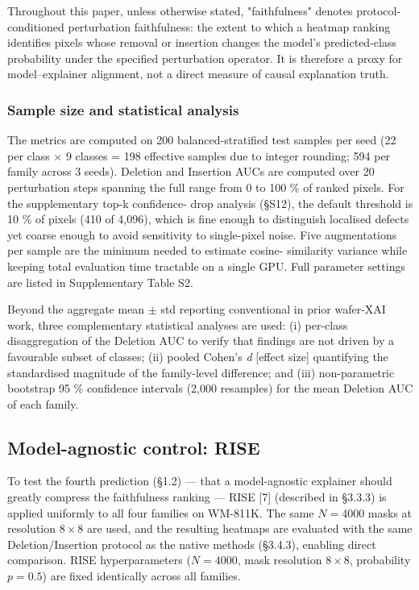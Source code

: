 \documentclass[11pt,a4paper]{article}
\begin{document}
Throughout this paper, unless otherwise stated, "faithfulness" denotes protocol-conditioned perturbation faithfulness: the extent to which a heatmap ranking identifies pixels whose removal or insertion changes the model's predicted-class probability under the specified perturbation operator. It is therefore a proxy for model--explainer alignment, not a direct measure of causal explanation truth.

\subsubsection{Sample size and statistical analysis}

The metrics are computed on 200 balanced-stratified test samples per seed (22 per class $\times$ 9 classes = 198 effective samples due to integer rounding; 594 per family across 3 seeds). Deletion and Insertion AUCs are computed over 20 perturbation steps spanning the full range from 0 to 100 \% of ranked pixels. For the supplementary top-k confidence- drop analysis (\S{}S12), the default threshold is 10 \% of pixels (410 of 4,096), which is fine enough to distinguish localised defects yet coarse enough to avoid sensitivity to single-pixel noise. Five augmentations per sample are the minimum needed to estimate cosine- similarity variance while keeping total evaluation time tractable on a single GPU. Full parameter settings are listed in Supplementary Table S2.

Beyond the aggregate mean $\pm$ std reporting conventional in prior wafer-XAI work, three complementary statistical analyses are used: (i) per-class disaggregation of the Deletion AUC to verify that findings are not driven by a favourable subset of classes; (ii) pooled Cohen's \emph{d} [effect size] quantifying the standardised magnitude of the family-level difference; and (iii) non-parametric bootstrap 95 \% confidence intervals (2,000 resamples) for the mean Deletion AUC of each family.

\subsection{Model-agnostic control: RISE}

To test the fourth prediction (\S{}1.2) --- that a model-agnostic explainer should greatly compress the faithfulness ranking --- RISE [7] (described in \S{}3.3.3) is applied uniformly to all four families on WM-811K. The same $N{=}4000$ masks at resolution $8{\times}8$ are used, and the resulting heatmaps are evaluated with the same Deletion/Insertion protocol as the native methods (\S{}3.4.3), enabling direct comparison. RISE hyperparameters ($N{=}4000$, mask resolution $8{\times}8$, probability $p{=}0.5$) are fixed identically across all families.
\end{document}
